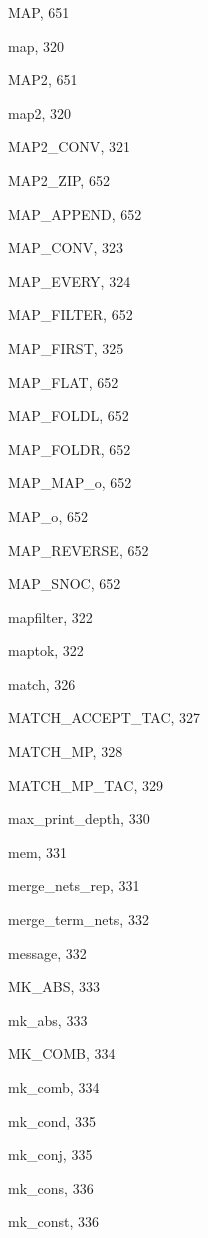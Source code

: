 \begin{theindex}
  \indexspace

  \item {\ptt MAP}, 651
  \item {\ptt map}, 320
  \item {\ptt MAP2}, 651
  \item {\ptt map2}, 320
  \item {\ptt MAP2\_CONV}, 321
  \item {\ptt MAP2\_ZIP}, 652
  \item {\ptt MAP\_APPEND}, 652
  \item {\ptt MAP\_CONV}, 323
  \item {\ptt MAP\_EVERY}, 324
  \item {\ptt MAP\_FILTER}, 652
  \item {\ptt MAP\_FIRST}, 325
  \item {\ptt MAP\_FLAT}, 652
  \item {\ptt MAP\_FOLDL}, 652
  \item {\ptt MAP\_FOLDR}, 652
  \item {\ptt MAP\_MAP\_o}, 652
  \item {\ptt MAP\_o}, 652
  \item {\ptt MAP\_REVERSE}, 652
  \item {\ptt MAP\_SNOC}, 652
  \item {\ptt mapfilter}, 322
  \item {\ptt maptok}, 322
  \item {\ptt match}, 326
  \item {\ptt MATCH\_ACCEPT\_TAC}, 327
  \item {\ptt MATCH\_MP}, 328
  \item {\ptt MATCH\_MP\_TAC}, 329
  \item {\ptt max\_print\_depth}, 330
  \item {\ptt mem}, 331
  \item {\ptt merge\_nets\_rep}, 331
  \item {\ptt merge\_term\_nets}, 332
  \item {\ptt message}, 332
  \item {\ptt MK\_ABS}, 333
  \item {\ptt mk\_abs}, 333
  \item {\ptt MK\_COMB}, 334
  \item {\ptt mk\_comb}, 334
  \item {\ptt mk\_cond}, 335
  \item {\ptt mk\_conj}, 335
  \item {\ptt mk\_cons}, 336
  \item {\ptt mk\_const}, 336

\end{theindex}
